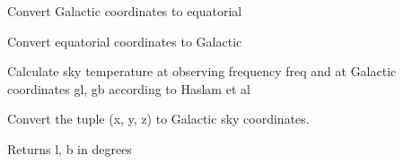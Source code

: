 \documentclass[letterpaper,10pt,english]{sphinxmanual}
\begin{document}

\begin{fulllineitems}
\label{\detokenize{module-level-docs:galacticops.lb_to_radec}}
\pysigstartsignatures
\pysiglinewithargsret
{}
{\sphinxparamcomma {}}
{}
\pysigstopsignatures
\sphinxAtStartPar
Convert Galactic coordinates to equatorial

\end{fulllineitems}


\begin{fulllineitems}
\label{\detokenize{module-level-docs:galacticops.ra_dec_to_lb}}
\pysigstartsignatures
\pysiglinewithargsret
{}
{\sphinxparamcomma {}}
{}
\pysigstopsignatures
\sphinxAtStartPar
Convert equatorial coordinates to Galactic

\end{fulllineitems}


\begin{fulllineitems}
\label{\detokenize{module-level-docs:galacticops.tsky}}
\pysigstartsignatures
\pysiglinewithargsret
{}
{\sphinxparamcomma {}\sphinxparamcomma {}}
{}
\pysigstopsignatures
\sphinxAtStartPar
Calculate sky temperature at observing frequency freq and at Galactic coordinates gl, gb according to Haslam et al

\end{fulllineitems}


\begin{fulllineitems}
\label{\detokenize{module-level-docs:galacticops.xyz_to_lb}}
\pysigstartsignatures
\pysiglinewithargsret
{}
{\sphinxparamcomma {}\sphinxparamcomma {}}
{}
\pysigstopsignatures
\sphinxAtStartPar
Convert the tuple (x, y, z) to Galactic sky coordinates.

\sphinxAtStartPar
Returns l, b in degrees

\end{fulllineitems}
\end{document}
